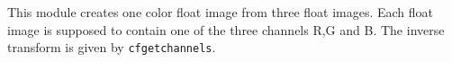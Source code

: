 This module creates one color float image from three float images.
Each float image is supposed to contain one of the three channels R,G and B.
The inverse transform is given by \verb+cfgetchannels+.
